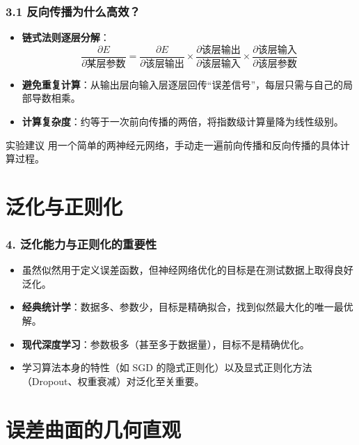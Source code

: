 \documentclass[t,aspectratio=169]{beamer} %
\begin{document}
\begin{frame}
    \frametitle{3.1 反向传播为什么高效？}
    \begin{itemize}
        \item \textbf{链式法则逐层分解}：
        \[
        \frac{\partial E}{\partial \text{某层参数}} = \frac{\partial E}{\partial \text{该层输出}} \times \frac{\partial \text{该层输出}}{\partial \text{该层输入}} \times \frac{\partial \text{该层输入}}{\partial \text{该层参数}}
        \]
        \item \textbf{避免重复计算}：从输出层向输入层逐层回传“误差信号”，每层只需与自己的局部导数相乘。
        \item \textbf{计算复杂度}：约等于一次前向传播的两倍，将指数级计算量降为线性级别。
    \end{itemize}
    \begin{block}{实验建议}
        用一个简单的两神经元网络，手动走一遍前向传播和反向传播的具体计算过程。
    \end{block}
\end{frame}

\section{泛化与正则化}

\begin{frame}
    \frametitle{4. 泛化能力与正则化的重要性}
    \begin{itemize}
        \item 虽然似然用于定义误差函数，但神经网络优化的目标是\alert{在测试数据上取得良好泛化}。
        \item \textbf{经典统计学}：数据多、参数少，目标是\alert{精确拟合}，找到似然最大化的唯一最优解。
        \item \textbf{现代深度学习}：参数极多（甚至多于数据量），目标\alert{不是精确优化}。
        \item 学习算法本身的特性（如 SGD 的隐式正则化）以及显式正则化方法（Dropout、权重衰减）对泛化至关重要。
    \end{itemize}
\end{frame}

\section{误差曲面的几何直观}
\end{document}
